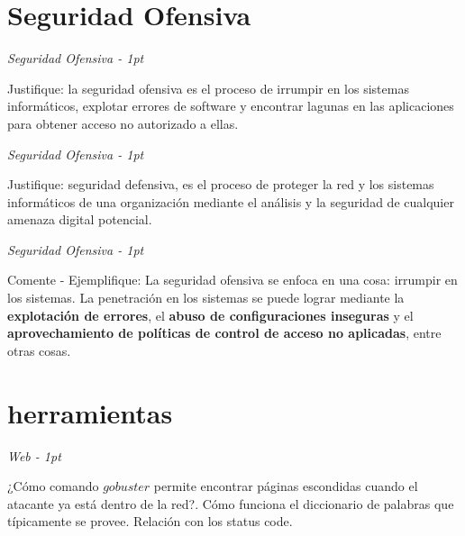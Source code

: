 \section*{Seguridad Ofensiva}

\begin{flushright}
   \textit{Seguridad Ofensiva - 1pt}
\end{flushright}

\noindent Justifique:  la seguridad ofensiva es el proceso de irrumpir en los sistemas informáticos, explotar errores de software y encontrar lagunas en las aplicaciones para obtener acceso no autorizado a ellas.\\


\begin{flushright}
   \textit{Seguridad Ofensiva - 1pt}
\end{flushright}

\noindent Justifique: 
seguridad defensiva,  es el proceso de proteger la red y los sistemas informáticos de una organización mediante el análisis y la seguridad de cualquier amenaza digital potencial.



\begin{flushright}
   \textit{Seguridad Ofensiva - 1pt}
\end{flushright}

\noindent Comente - Ejemplifique: 
La seguridad ofensiva se enfoca en una cosa: irrumpir en los sistemas. La penetración en los sistemas se puede lograr mediante la \textbf{explotación de errores}, el \textbf{abuso de configuraciones inseguras} y el \textbf{aprovechamiento de políticas de control de acceso no aplicadas}, entre otras cosas. %
\\



\section*{herramientas}
\begin{flushright}
   \textit{ Web - 1pt}
\end{flushright}

\noindent ¿Cómo comando $gobuster$ permite encontrar páginas escondidas cuando el atacante ya está dentro de la red?. Cómo funciona el diccionario de palabras que típicamente se provee. Relación con los status code. \\


